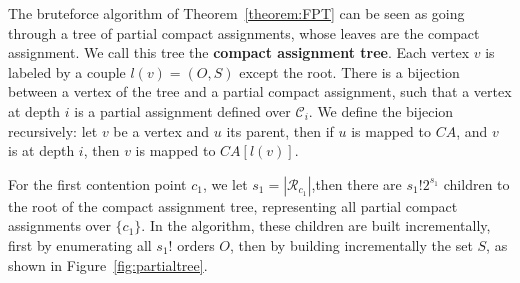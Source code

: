 The bruteforce algorithm of Theorem~\ref{theorem:FPT} can be seen as going through a tree of partial compact assignments,
whose leaves are the compact assignment. We call this tree the \textbf{compact assignment tree}. Each vertex $v$ is labeled by a couple $l(v) = (O,S)$ except the root. There is a bijection between a vertex of the tree and a partial compact assignment, such that a vertex at depth $i$ is a partial assignment defined over $\mathcal{C}_i$.
We define the bijecion recursively: let $v$ be a vertex and $u$ its parent, then if $u$ is mapped to $CA$,
and $v$ is at depth $i$, then $v$ is mapped to $CA[l(v)]$.

For the first contention point $c_1$, we let $s_1 = |\mathcal{R}_{c_1}|$,then there are $s_1!2^{s_1}$ children
to the root of the compact assignment tree, representing all partial compact assignments over $\{c_1\}$.
In the algorithm, these children are built incrementally, first by enumerating all $s_1!$ orders $O$, then 
by building incrementally the set $S$, as shown in Figure~\ref{fig:partialtree}.


